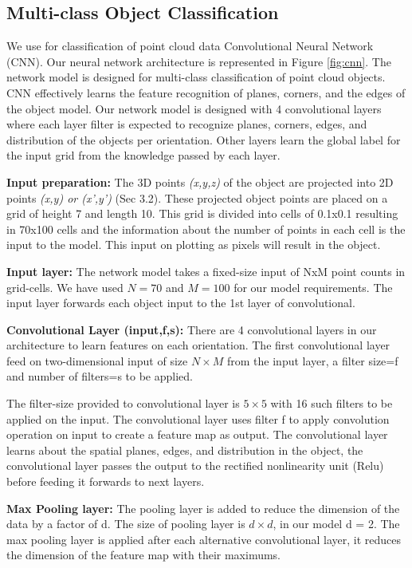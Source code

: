 \subsection{Multi-class Object Classification}
We use for classification of point cloud data Convolutional Neural Network (CNN).
Our neural network architecture is represented in Figure \ref{fig:cnn}.
The network model is designed for multi-class classification of 
point cloud objects.
CNN effectively learns the feature recognition of planes, corners, and the edges of the object model.
Our network model is designed with 4 convolutional layers where each layer filter is expected to
recognize planes, corners, edges, and distribution of the objects per orientation.
Other layers learn the global label for the input grid from the knowledge passed by each layer.

\textbf{Input preparation:}
The 3D points \textit{(x,y,z)} of the object are projected into 2D points \textit{(x,y) or (x',y')} (Sec 3.2).
These projected object points are placed on a grid of height 7 and length 10.
This grid is divided into cells of 0.1x0.1 resulting in 70x100 cells and the information about the number of points in each cell is the input to the model.
This input on plotting as pixels will result in the object.

\textbf{Input layer:}
The network model takes a fixed-size input of NxM point counts in grid-cells. We have
used $N=70$ and $M=100$ for our model requirements. The input layer forwards each object input to the 1st layer
of convolutional.


\textbf{Convolutional Layer (input,f,s):}
There are 4 convolutional layers in our architecture to learn features on each orientation.
The first convolutional layer feed on two-dimensional input of size $N \times  M$ from
the input layer, a filter size=f and number of filters=s to be applied.

The filter-size provided to convolutional layer is $5 \times 5$ with 16 such filters to be applied on the input.
The convolutional layer uses filter f to apply convolution operation on input to create a feature map as output.
The convolutional layer learns about the spatial planes, edges, and distribution in the object,
the convolutional layer passes the output to the rectified nonlinearity unit (Relu) before feeding
it forwards to next layers.

\textbf{Max Pooling layer:}
The pooling layer is added to reduce the dimension of the data by a factor of d. 
The size of pooling layer is  $d \times  d$, in our model d = 2. 
The max pooling layer is applied after each alternative convolutional
layer, it reduces the dimension of the feature map with their maximums.

